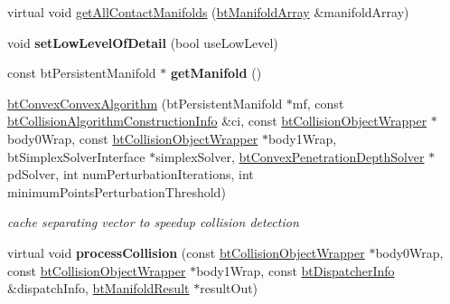 \begin{DoxyCompactItemize}
\item 
virtual void \hyperlink{classbtConvexConvexAlgorithm_aa2a195cdd3b45c169c15ea2de85c4038}{get\+All\+Contact\+Manifolds} (\hyperlink{classbtAlignedObjectArray}{bt\+Manifold\+Array} \&manifold\+Array)
\item 
\mbox{\label{classbtConvexConvexAlgorithm_a64464ed857fba6750ded542c47ee4e45}} 
void {\bfseries set\+Low\+Level\+Of\+Detail} (bool use\+Low\+Level)
\item 
\mbox{\label{classbtConvexConvexAlgorithm_a16a0cc2ea9ef78c3417ab93c3bfff012}} 
const bt\+Persistent\+Manifold $\ast$ {\bfseries get\+Manifold} ()
\item 
\mbox{\label{classbtConvexConvexAlgorithm_af60334d81e10602a003a0d92ae918af4}} 
\hyperlink{classbtConvexConvexAlgorithm_af60334d81e10602a003a0d92ae918af4}{bt\+Convex\+Convex\+Algorithm} (bt\+Persistent\+Manifold $\ast$mf, const \hyperlink{structbtCollisionAlgorithmConstructionInfo}{bt\+Collision\+Algorithm\+Construction\+Info} \&ci, const \hyperlink{structbtCollisionObjectWrapper}{bt\+Collision\+Object\+Wrapper} $\ast$body0\+Wrap, const \hyperlink{structbtCollisionObjectWrapper}{bt\+Collision\+Object\+Wrapper} $\ast$body1\+Wrap, bt\+Simplex\+Solver\+Interface $\ast$simplex\+Solver, \hyperlink{classbtConvexPenetrationDepthSolver}{bt\+Convex\+Penetration\+Depth\+Solver} $\ast$pd\+Solver, int num\+Perturbation\+Iterations, int minimum\+Points\+Perturbation\+Threshold)
\begin{DoxyCompactList}\small\item\em cache separating vector to speedup collision detection \end{DoxyCompactList}\item 
\mbox{\label{classbtConvexConvexAlgorithm_afa59e68cdbba1206568fc7852db04ffc}} 
virtual void {\bfseries process\+Collision} (const \hyperlink{structbtCollisionObjectWrapper}{bt\+Collision\+Object\+Wrapper} $\ast$body0\+Wrap, const \hyperlink{structbtCollisionObjectWrapper}{bt\+Collision\+Object\+Wrapper} $\ast$body1\+Wrap, const \hyperlink{structbtDispatcherInfo}{bt\+Dispatcher\+Info} \&dispatch\+Info, \hyperlink{classbtManifoldResult}{bt\+Manifold\+Result} $\ast$result\+Out)
\item 
\mbox{\label{classbtConvexConvexAlgorithm_ab1b11d40217f97c7cb41aaa7eedfb7f7}} 

\end{DoxyCompactItemize}
